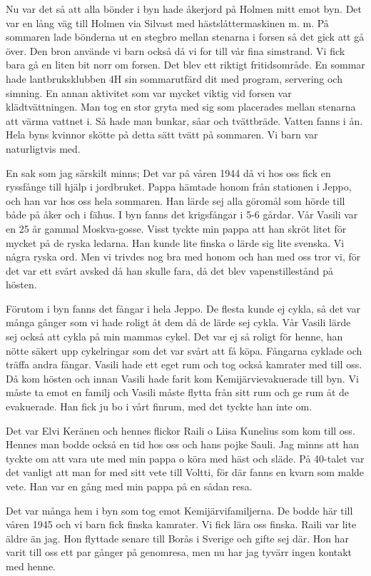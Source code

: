 Nu var det så att alla bönder i byn hade åkerjord på Holmen mitt emot byn. Det var en lång väg till Holmen via Silvast med hästslåttermaskinen m. m. På sommaren lade bönderna ut en stegbro mellan stenarna i forsen så det gick att gå över. Den bron använde vi barn också då vi for till vår fina simstrand. Vi fick bara gå en liten bit norr om forsen. Det blev ett riktigt fritidsområde. En sommar hade lantbruksklubben 4H sin sommarutfärd dit med program, servering och simning. En annan aktivitet som var mycket viktig vid forsen var klädtvättningen. Man tog en stor gryta med sig som placerades mellan stenarna att värma vattnet i. Så hade man bunkar, såar och tvättbräde. Vatten fanns i ån. Hela byns kvinnor skötte på detta sätt tvätt på sommaren. Vi barn var naturligtvis med.

En sak som jag särskilt minns; Det var på våren 1944 då vi hos oss fick en ryssfånge till hjälp i jordbruket. Pappa hämtade honom från stationen i Jeppo, och han var hos oss hela sommaren. Han lärde sej alla göromål som hörde till både på åker och i fähus. I byn fanns det krigsfångar i 5-6 gårdar. Vår Vasili var en 25 år gammal Moskva-gosse. Visst tyckte min pappa att han skröt litet för mycket på de ryska ledarna. Han kunde lite finska o lärde sig lite svenska. Vi några ryska ord. Men vi trivdes nog bra med honom och han med oss tror vi, för det var ett svårt avsked då han skulle fara, då det blev vapenstillestånd på hösten.

Förutom i byn fanns det fångar i hela Jeppo. De flesta kunde ej cykla, så det var många gånger som vi hade roligt åt dem då de lärde sej cykla. Vår Vasili lärde sej också att cykla på min mammas cykel. Det var ej så roligt för henne, han nötte säkert upp cykelringar som det var svårt att få köpa. Fångarna  cyklade och träffa andra fångar. Vasili hade ett eget rum och tog också kamrater med till oss.  Då kom hösten och innan Vasili hade farit kom Kemijärvievakuerade till byn. Vi måste ta emot en familj och Vasili måste flytta från sitt rum och ge rum åt de evakuerade. Han fick ju bo i vårt finrum, med det tyckte han inte om.

Det var Elvi Keränen och hennes flickor Raili o Liisa Kunelius som kom till oss. Hennes man bodde också en tid hos oss och hans pojke Sauli. Jag minns att han tyckte om att vara ute med min pappa o köra med häst och släde. På 40-talet var det vanligt att man for med sitt vete till Voltti, för där fanns en kvarn som malde vete. Han var en gång med min pappa på en sådan resa.

Det var många hem i byn som tog emot Kemijärvifamiljerna. De bodde här till våren 1945 och vi barn fick finska kamrater. Vi fick lära oss finska. Raili var lite äldre än jag. Hon flyttade senare till Borås i Sverige och gifte sej där. Hon har varit till oss ett par gånger på genomresa, men nu har jag tyvärr ingen kontakt med henne.

